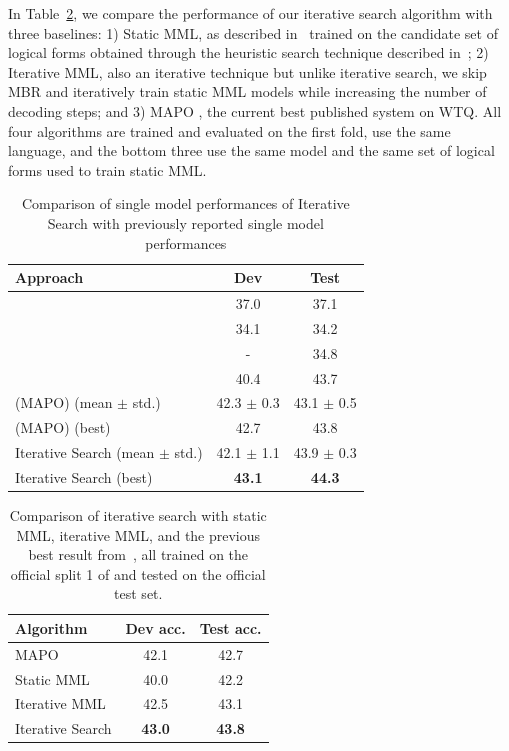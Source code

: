 In Table~\ref{tab:wtq_main_result}, we compare the performance of our iterative search algorithm with three baselines: 1) Static MML, as described in~ trained on the candidate set of logical forms obtained through the heuristic search technique described in~; 2) Iterative MML, also an iterative technique but unlike iterative search, we skip MBR and iteratively train static MML models while increasing the number of decoding steps; and 3) MAPO \citep{liang2018memory}, the current best published system on WTQ. All four algorithms are trained and evaluated on the first fold, use the same language, and the bottom three use the same model and the same set of logical forms used to train static MML.
\begin{table}
    \centering
    \begin{tabular}{lcc}
        \toprule
         \textbf{Approach} & \textbf{Dev} & \textbf{Test} \\
         \midrule
         \citet{pasupat2015compositional} & 37.0 & 37.1 \\
         \citet{neelakantan2016learning} & 34.1 & 34.2 \\
         \citet{Haug2018NeuralMR} & - & 34.8 \\
         \citet{zhang2017macro} & 40.4 & 43.7 \\
         \citet{liang2018memory} (MAPO) (mean $\pm$ std.) & 42.3 $\pm$ 0.3 & 43.1 $\pm$ 0.5 \\
         \citet{liang2018memory} (MAPO) (best) & 42.7 & 43.8 \\
         Iterative Search (mean $\pm$ std.) & 42.1 $\pm$ 1.1 & 43.9 $\pm$ 0.3 \\
         Iterative Search (best) & \textbf{43.1} & \textbf{44.3} \\
         \bottomrule
    \end{tabular}
    \caption{Comparison of single model performances of Iterative Search with previously reported single model performances}\label{tab:wtq_comparison}
\end{table}

\begin{table}
    \centering
    \begin{tabular}{lcc}
        \toprule
         \textbf{Algorithm} & \textbf{Dev acc.} & \textbf{Test acc.} \\
         \midrule
         MAPO & 42.1 & 42.7 \\
         \midrule
         Static MML & 40.0 & 42.2 \\
         Iterative MML & 42.5 & 43.1 \\
         Iterative Search & \textbf{43.0} & \textbf{43.8} \\
         \bottomrule
    \end{tabular}
    \caption{Comparison of iterative search with static MML, iterative MML, and the previous best result from~\cite{liang2018memory}, all trained on the official split 1 of \WTQ{} and tested on the official test set.}
    \label{tab:wtq_main_result}
\end{table}


